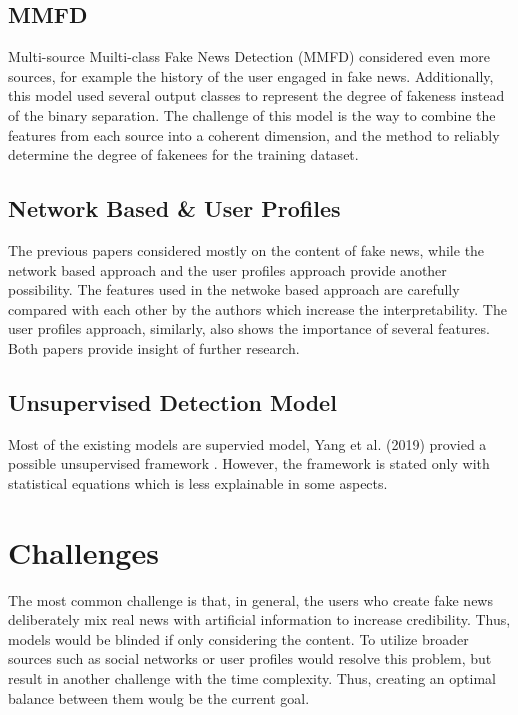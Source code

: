 \documentclass[sigconf ,nonacm]{acmart}
\begin{document}
\subsection{MMFD}
Multi-source Muilti-class Fake News Detection (MMFD) \cite{MMFD} considered even more sources, for example the history of the user engaged in fake news. Additionally, this model used several output classes to represent the degree of fakeness instead of the binary separation. The challenge of this model is the way to combine the features from each source into a coherent dimension, and the method to reliably determine the degree of fakenees for the training dataset.

\subsection{Network Based \& User Profiles}
The previous papers considered mostly on the content of fake news, while the network based approach \cite{NetworkBased} and the user profiles approach \cite{UserProfile} provide another possibility. The features used in the netwoke based approach are carefully compared with each other by the authors which increase the interpretability. The user profiles approach, similarly, also shows the importance of several features. Both papers provide insight of further research.

\subsection{Unsupervised Detection Model}
Most of the existing models are supervied model, Yang et al. (2019) provied a possible unsupervised framework \cite{Unsupervised}. However, the framework is stated only with statistical equations which is less explainable in some aspects.

\section{Challenges}
The most common challenge is that, in general, the users who create fake news deliberately mix real news with artificial information to increase credibility. Thus, models would be blinded if only considering the content. To utilize broader sources such as social networks or user profiles would resolve this problem, but result in another challenge with the time complexity. Thus, creating an optimal balance between them woulg be the current goal.




\end{document}
